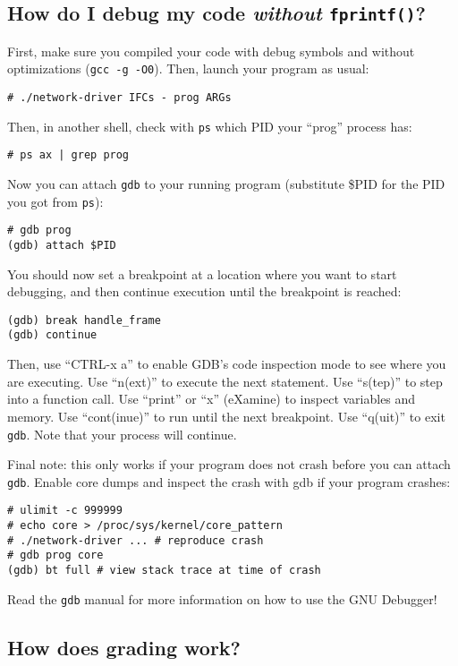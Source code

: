 \documentclass{article}
\begin{document}
\subsection{How do I debug my code {\em without} {\tt fprintf()}?}

First, make sure you compiled your code with debug symbols and
without optimizations ({\tt gcc -g -O0}).  Then, launch your program as usual:
\begin{verbatim}
# ./network-driver IFCs - prog ARGs
\end{verbatim}
Then, in another shell, check with {\tt ps} which PID your ``prog'' process has:
\begin{verbatim}
# ps ax | grep prog
\end{verbatim}
Now you can attach {\tt gdb} to your running program (substitute \$PID for the PID you got from {\tt ps}):
\begin{verbatim}
# gdb prog
(gdb) attach $PID
\end{verbatim}
You should now set a breakpoint at a location where you want to start debugging,
and then continue execution until the breakpoint is reached:
\begin{verbatim}
(gdb) break handle_frame
(gdb) continue
\end{verbatim}
Then, use ``CTRL-x a'' to enable GDB's code inspection mode to see where you are
executing.  Use ``n(ext)'' to execute the next statement. Use ``s(tep)'' to step
into a function call.  Use ``print'' or ``x'' (eXamine) to inspect variables and
memory.  Use ``cont(inue)'' to run until the next breakpoint. Use ``q(uit)'' to
exit {\tt gdb}. Note that your process will continue.

Final note: this only works if your program does not crash before you can attach
{\tt gdb}.  Enable core dumps and inspect the crash with gdb if your program
crashes:
\begin{verbatim}
# ulimit -c 999999
# echo core > /proc/sys/kernel/core_pattern
# ./network-driver ... # reproduce crash
# gdb prog core
(gdb) bt full # view stack trace at time of crash
\end{verbatim}
Read the {\tt gdb} manual for more information on how to use the GNU Debugger!


\subsection{How does grading work?}
\end{document}
